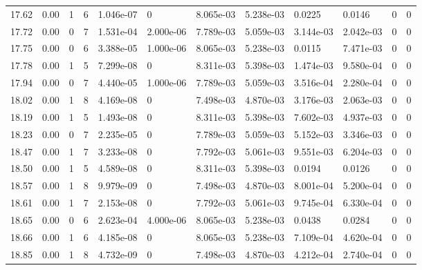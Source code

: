 \documentclass[preview]{standalone}
\begin{document}
{{{{{{\begin{tabular}{L{1.2cm}C{1.2cm} C{0.3cm}C{0.5cm} C{1.4cm}C{1.4cm} C{1.4cm}C{1.4cm} C{1.6cm}C{1.6cm} C{1.6cm}C{1.6cm}}
  17.62  &  0.00  & 1     &  6 &  1.046e-07  & 0  &  8.065e-03&   5.238e-03& 0.0225 & 0.0146   &  0 & 0  \\ 
  17.72  &  0.00  & 0     &  7 &  1.531e-04  & 2.000e-06  &  7.789e-03&   5.059e-03& 3.144e-03 & 2.042e-03   &  0 & 0  \\ 
  17.75  &  0.00  & 0     &  6 &  3.388e-05  & 1.000e-06  &  8.065e-03&   5.238e-03& 0.0115 & 7.471e-03   &  0 & 0  \\ 
  17.78  &  0.00  & 1     &  5 &  7.299e-08  & 0  &  8.311e-03&   5.398e-03& 1.474e-03 & 9.580e-04   &  0 & 0  \\ 
  17.94  &  0.00  & 0     &  7 &  4.440e-05  & 1.000e-06  &  7.789e-03&   5.059e-03& 3.516e-04 & 2.280e-04   &  0 & 0  \\ 
  18.02  &  0.00  & 1     &  8 &  4.169e-08  & 0  &  7.498e-03&   4.870e-03& 3.176e-03 & 2.063e-03   &  0 & 0  \\ 
  18.19  &  0.00  & 1     &  5 &  1.493e-08  & 0  &  8.311e-03&   5.398e-03& 7.602e-03 & 4.937e-03   &  0 & 0  \\ 
  18.23  &  0.00  & 0     &  7 &  2.235e-05  & 0  &  7.789e-03&   5.059e-03& 5.152e-03 & 3.346e-03   &  0 & 0  \\ 
  18.47  &  0.00  & 1     &  7 &  3.233e-08  & 0  &  7.792e-03&   5.061e-03& 9.551e-03 & 6.204e-03   &  0 & 0  \\ 
  18.50  &  0.00  & 1     &  5 &  4.589e-08  & 0  &  8.311e-03&   5.398e-03& 0.0194 & 0.0126   &  0 & 0  \\ 
  18.57  &  0.00  & 1     &  8 &  9.979e-09  & 0  &  7.498e-03&   4.870e-03& 8.001e-04 & 5.200e-04   &  0 & 0  \\ 
  18.61  &  0.00  & 1     &  7 &  2.153e-08  & 0  &  7.792e-03&   5.061e-03& 9.745e-04 & 6.330e-04   &  0 & 0  \\ 
  18.65  &  0.00  & 0     &  6 &  2.623e-04  & 4.000e-06  &  8.065e-03&   5.238e-03& 0.0438 & 0.0284   &  0 & 0  \\ 
  18.66  &  0.00  & 1     &  6 &  4.185e-08  & 0  &  8.065e-03&   5.238e-03& 7.109e-04 & 4.620e-04   &  0 & 0  \\ 
  18.85  &  0.00  & 1     &  8 &  4.732e-09  & 0  &  7.498e-03&   4.870e-03& 4.212e-04 & 2.740e-04   &  0 & 0  \\ 
\hline 
\end{tabular} 

}}}}}}
\end{document}
